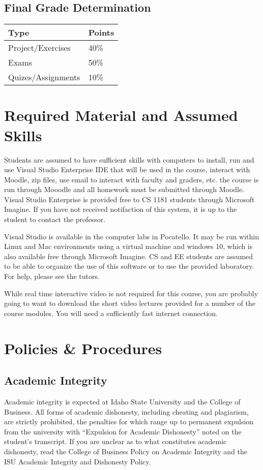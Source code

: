 \documentclass[a4paper,11pt,twocolumn]{article}
\begin{document}
\subsection*{Final Grade Determination}
\begin{tabular}{|l|l|}
\hline 
Type & Points\tabularnewline
\hline 
\hline 
Project/Exercises & 40\%\tabularnewline
\hline 
Exams & 50\%\tabularnewline
\hline 
Quizes/Assignments & 10\%\tabularnewline
\hline 
\end{tabular}

\section*{Required Material and Assumed Skills}

Students are assumed to have sufficient skills with computers to install, run and use Visual Studio Enterprise IDE that will be used in the course, interact with Moodle, zip files, use email to interact with faculty and graders, etc. the course is run through Mooodle and all homework must be submitted through Moodle. Visual Studio Enterprise is provided free to CS 1181 students through Microsoft Imagine. If you have not received notifaction of this system, it is up to the student to contact the professor.

Visual Studio is available in the computer labs in Pocatello. It may be run within Linux and Mac environments using a virtual machine and windows 10, which is also available free through Microsoft Imagine. CS and EE students are assumed to be able to organize the use of this software or to use the provided laboratory. For help, please see the tutors.

While real time interactive video is not required for this course, you are probably going to want to download the short video lectures provided for a number of the course modules. You will need a sufficiently fast internet connection.

\section*{Policies \& Procedures}

\subsection*{Academic Integrity}
\noindent Academic integrity is expected at Idaho State University and the College of Business. All forms of academic dishonesty, including cheating and plagiarism, are strictly prohibited, the penalties for which range up to permanent expulsion from the university with ``Expulsion for Academic Dishonesty'' noted on the student's transcript. If you are unclear as to what constitutes academic dishonesty, read the College of Business Policy on Academic Integrity and the ISU Academic Integrity and Dishonesty Policy.\\
\end{document}
